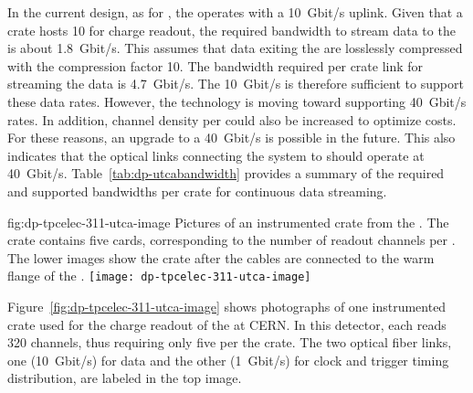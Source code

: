 In the current  design, 
as for , the  operates with a \SI{10}{Gbit/s} uplink. Given that a  crate hosts \num{10}  for charge readout, the required bandwidth to stream data to the  is about \SI{1.8}{Gbit/s}. This assumes that data exiting the  are losslessly compressed with the compression factor \num{10}. The bandwidth required per crate link for streaming the  data is \SI{4.7}{Gbit/s}. The \SI{10}{Gbit/s}  is therefore sufficient to support these data rates. However, the technology is moving toward supporting \SI{40}{Gbit/s} rates. In addition, channel density per  could also be increased to optimize costs. For these reasons, an upgrade to a \SI{40}{Gbit/s}  is possible in the future. This also indicates that the optical links connecting the  system to   should operate at \SI{40}{Gbit/s}. Table~\ref{tab:dp-utcabandwidth} provides a summary of the required and supported bandwidths per  crate for continuous data streaming.


\begin{dunefigure}
{fig:dp-tpcelec-311-utca-image}
{Pictures of an instrumented  crate from the . The crate contains five  cards, corresponding to the number of readout channels per  . The lower images show the crate after the  cables are connected to the warm flange of the .}
\texttt{[image: dp-tpcelec-311-utca-image]}
\end{dunefigure}

Figure~\ref{fig:dp-tpcelec-311-utca-image} shows photographs of one instrumented  crate used for the charge readout of the  at CERN. In this detector, each  reads \num{320} channels, thus requiring only five  per the  crate. The two optical fiber links, one (\SI{10}{Gbit/s}) for data and the other (\SI{1}{Gbit/s}) for clock and trigger timing distribution, are labeled %
in the top image. %

